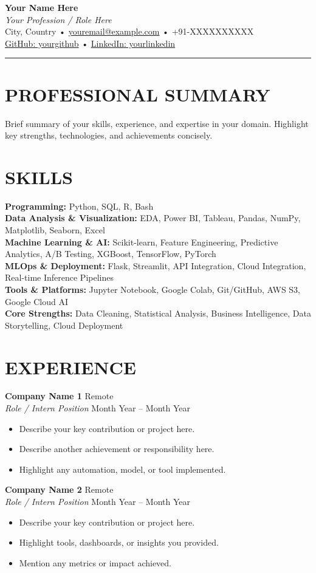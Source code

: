 \documentclass[a4paper,10pt]{article}
\makeatletter
\newcommand{\contact}[3]{
\begin{center}
    {\LARGE \textbf{Your Name Here}}\\[2pt]
    \textit{Your Profession / Role Here}\\[2pt]
    City, Country • \href{mailto:youremail@example.com}{youremail@example.com} • +91-XXXXXXXXXX\\[1pt]
    \href{https://github.com/yourgithub}{GitHub: yourgithub} • \href{https://linkedin.com/in/yourlinkedin}{LinkedIn: yourlinkedin}
\end{center}
\vspace{0.2cm}
\hrule
\vspace{0.3cm}
}
\makeatother
\begin{document}
\contact{Your Name Here}{Your Profession / Role Here}{}

\section*{PROFESSIONAL SUMMARY}
Brief summary of your skills, experience, and expertise in your domain. Highlight key strengths, technologies, and achievements concisely.

\section*{SKILLS}
\textbf{Programming:} Python, SQL, R, Bash\\
\textbf{Data Analysis \& Visualization:} EDA, Power BI, Tableau, Pandas, NumPy, Matplotlib, Seaborn, Excel\\
\textbf{Machine Learning \& AI:} Scikit-learn, Feature Engineering, Predictive Analytics, A/B Testing, XGBoost, TensorFlow, PyTorch\\
\textbf{MLOps \& Deployment:} Flask, Streamlit, API Integration, Cloud Integration, Real-time Inference Pipelines\\
\textbf{Tools \& Platforms:} Jupyter Notebook, Google Colab, Git/GitHub, AWS S3, Google Cloud AI\\
\textbf{Core Strengths:} Data Cleaning, Statistical Analysis, Business Intelligence, Data Storytelling, Cloud Deployment

\section*{EXPERIENCE}

\textbf{Company Name 1} \hfill Remote\\
\textit{Role / Intern Position} \hfill Month Year -- Month Year
\begin{itemize}[nosep]
    \item Describe your key contribution or project here.
    \item Describe another achievement or responsibility here.
    \item Highlight any automation, model, or tool implemented.
\end{itemize}

\textbf{Company Name 2} \hfill Remote\\
\textit{Role / Intern Position} \hfill Month Year -- Month Year
\begin{itemize}[nosep]
    \item Describe your key contribution or project here.
    \item Highlight tools, dashboards, or insights you provided.
    \item Mention any metrics or impact achieved.
\end{itemize}
\end{document}

